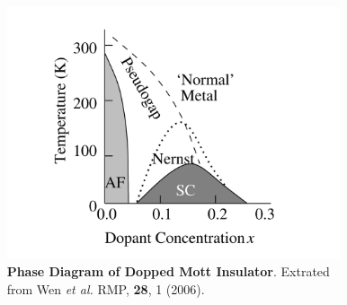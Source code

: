 \documentclass[10pt,aspectratio=43,xcolor=x11names,t]{beamer}%
\begin{document}
\begin{frame}
\begin{columns}
\begin{column}{0.45\textwidth}
\begin{figure}[!htp]
					\end{figure}
				\end{column}
				\begin{column}{0.45\textwidth}
					\begin{figure}[!htp]
						\centering
						\includegraphics[scale=0.8]{Mott.png}
						\caption{\textbf{Phase Diagram of Dopped Mott Insulator}. Extrated from {\scriptsize Wen \textit{et al.} RMP, \textbf{28}, 1 (2006)}.}
					\end{figure}
				\end{column}
			\end{columns}
			
		\end{frame}
		
\end{document}
